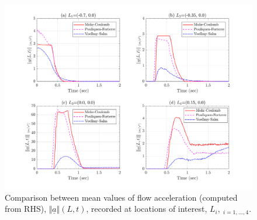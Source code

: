 \documentclass{article}
\begin{document}
\begin{figure}[H]
        \centering
        \includegraphics[width=1\textwidth]{InclinedPlane/LocalRecords/Records/accel_meanR.png}
        \caption{Comparison between mean values of flow acceleration (computed from RHS), $\Vert \underline{a} \Vert(L,t)$, recorded at locations of interest, $L_i, \ _{i=1,...,4}$.}
        \label{fig:Ramp-LM-AccR-means}
\end{figure}
\end{document}

